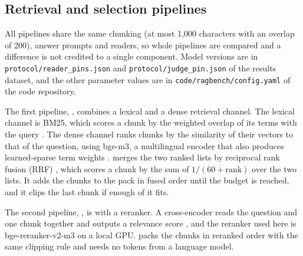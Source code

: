 \subsection{Retrieval and selection pipelines}
\label{sec:systems}
All pipelines share the same chunking (at most 1,000 characters with an overlap of 200), answer prompts and readers, so whole pipelines are compared and a difference is not credited to a single component. Model versions are in \texttt{protocol/reader\_pins.json} and \texttt{protocol/judge\_pin.json} of the results dataset, and the other parameter values are in \texttt{code/ragbench/config.yaml} of the code repository.

The first pipeline, \hybrid{}, combines a lexical and a dense retrieval channel. The lexical channel is BM25, which scores a chunk by the weighted overlap of its terms with the query \citep{robertson2009bm25}. The dense channel ranks chunks by the similarity of their vectors to that of the question, using bge-m3, a multilingual encoder that also produces learned-sparse term weights \citep{chen2024bgem3,karpukhin2020dpr}. \hybrid{} merges the two ranked lists by reciprocal rank fusion (RRF) \citep{cormack2009rrf}, which scores a chunk by the sum of $1/(60+\mathrm{rank})$ over the two lists. It adds the chunks to the pack in fused order until the budget is reached, and it clips the last chunk if enough of it fits.

The second pipeline, \hr{}, is \hybrid{} with a reranker. A cross-encoder reads the question and one chunk together and outputs a relevance score \citep{nogueira2019monobert}, and the reranker used here is bge-reranker-v2-m3 on a local GPU. \hr{} packs the chunks in reranked order with the same clipping rule and needs no tokens from a language model.

